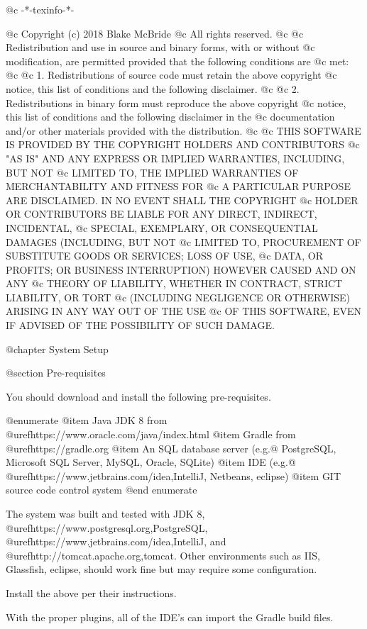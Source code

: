 @c -*-texinfo-*-

@c  Copyright (c) 2018 Blake McBride
@c  All rights reserved.
@c
@c  Redistribution and use in source and binary forms, with or without
@c  modification, are permitted provided that the following conditions are
@c  met:
@c
@c  1. Redistributions of source code must retain the above copyright
@c  notice, this list of conditions and the following disclaimer.
@c
@c  2. Redistributions in binary form must reproduce the above copyright
@c  notice, this list of conditions and the following disclaimer in the
@c  documentation and/or other materials provided with the distribution.
@c
@c  THIS SOFTWARE IS PROVIDED BY THE COPYRIGHT HOLDERS AND CONTRIBUTORS
@c  "AS IS" AND ANY EXPRESS OR IMPLIED WARRANTIES, INCLUDING, BUT NOT
@c  LIMITED TO, THE IMPLIED WARRANTIES OF MERCHANTABILITY AND FITNESS FOR
@c  A PARTICULAR PURPOSE ARE DISCLAIMED. IN NO EVENT SHALL THE COPYRIGHT
@c  HOLDER OR CONTRIBUTORS BE LIABLE FOR ANY DIRECT, INDIRECT, INCIDENTAL,
@c  SPECIAL, EXEMPLARY, OR CONSEQUENTIAL DAMAGES (INCLUDING, BUT NOT
@c  LIMITED TO, PROCUREMENT OF SUBSTITUTE GOODS OR SERVICES; LOSS OF USE,
@c  DATA, OR PROFITS; OR BUSINESS INTERRUPTION) HOWEVER CAUSED AND ON ANY
@c  THEORY OF LIABILITY, WHETHER IN CONTRACT, STRICT LIABILITY, OR TORT
@c  (INCLUDING NEGLIGENCE OR OTHERWISE) ARISING IN ANY WAY OUT OF THE USE
@c  OF THIS SOFTWARE, EVEN IF ADVISED OF THE POSSIBILITY OF SUCH DAMAGE.


@chapter System Setup


@section Pre-requisites

You should download and install the following pre-requisites.

@enumerate
@item
Java JDK 8 from @uref{https://www.oracle.com/java/index.html}
@item
Gradle from @uref{https://gradle.org}
@item
An SQL database server (e.g.@ PostgreSQL, Microsoft SQL Server, MySQL, Oracle, SQLite)
@item
IDE (e.g.@ @uref{https://www.jetbrains.com/idea,IntelliJ}, Netbeans, eclipse)
@item
GIT source code control system
@end enumerate

The system was built and tested with JDK 8, @uref{https://www.postgresql.org,PostgreSQL}, @uref{https://www.jetbrains.com/idea,IntelliJ}, and 
@uref{http://tomcat.apache.org,tomcat}.  Other environments such as IIS, Glassfish, eclipse, should work fine but may require some configuration.

Install the above per their instructions.

With the proper plugins, all of the IDE's can import the Gradle build files.

